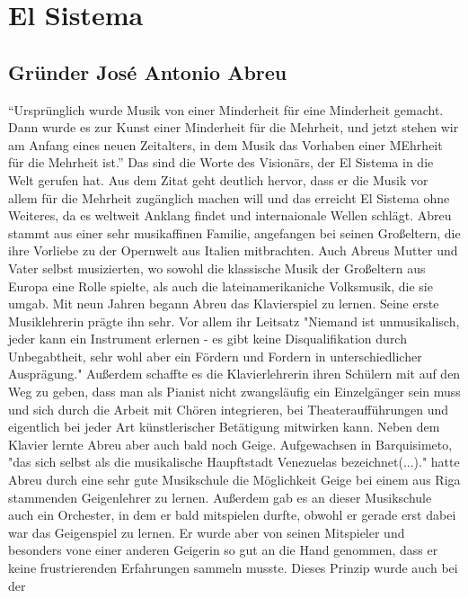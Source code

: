 \section{El Sistema}

\subsection{Gründer José Antonio Abreu}
\enquote{Ursprünglich wurde Musik von einer Minderheit für eine Minderheit
gemacht. Dann wurde es zur Kunst einer Minderheit für die Mehrheit, und jetzt
stehen wir am Anfang eines neuen Zeitalters, in dem Musik das Vorhaben einer
MEhrheit für die Mehrheit ist.} \autocite[5]{kaufmann:el_sistema} Das sind die
Worte des Visionärs, der El Sistema in die Welt gerufen hat. Aus dem Zitat geht
deutlich hervor, dass er die Musik vor allem für die Mehrheit zugänglich machen
will und das erreicht El Sistema ohne Weiteres, da es weltweit Anklang findet
und internaionale Wellen schlägt. Abreu stammt aus einer sehr musikaffinen
Familie, angefangen bei seinen Großeltern, die ihre Vorliebe zu der Opernwelt
aus Italien mitbrachten. Auch Abreus Mutter und Vater selbst musizierten, wo
sowohl die klassische Musik der Großeltern aus Europa eine Rolle spielte, als
auch die lateinamerikaniche Volksmusik, die sie umgab. Mit neun Jahren begann
Abreu das Klavierspiel zu lernen. Seine erste Musiklehrerin prägte ihn sehr. Vor
allem ihr Leitsatz "Niemand ist unmusikalisch, jeder kann ein Instrument
erlernen - es gibt keine Disqualifikation durch Unbegabtheit, sehr wohl aber ein
Fördern und Fordern in unterschiedlicher Ausprägung."
\autocite[20]{kaufmann:el_sistema} Außerdem schaffte es die Klavierlehrerin
ihren Schülern mit auf den Weg zu geben, dass man als Pianist nicht zwangsläufig
ein Einzelgänger sein muss und sich durch die Arbeit mit Chören integrieren, bei
Theateraufführungen und eigentlich bei jeder Art künstlerischer Betätigung
mitwirken kann. Neben dem Klavier lernte Abreu aber auch bald noch Geige.
Aufgewachsen in Barquisimeto, "das sich selbst als die musikalische Haupftstadt
Venezuelas bezeichnet(...)." \autocite[22]{kaufmann:el_sistema} hatte Abreu
durch eine sehr gute Musikschule die Möglichkeit Geige bei einem aus Riga
stammenden Geigenlehrer zu lernen. Außerdem gab es an dieser Musikschule auch
ein Orchester, in dem er bald mitspielen durfte, obwohl er
gerade erst dabei war das Geigenspiel zu lernen. Er wurde aber von seinen Mitspieler und
besonders vone einer anderen Geigerin so gut an die Hand genommen, dass er keine
frustrierenden Erfahrungen sammeln musste. Dieses Prinzip wurde auch bei der
